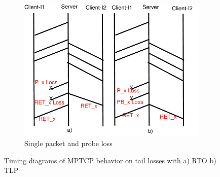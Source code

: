 \documentclass[10pt,conference,compsoc]{IEEEtran}
\begin{document}
\begin{figure}[!tbp]
\begin{subfigure}[b]{0.32\textwidth}
  	\includegraphics[angle=0, width=\textwidth, natwidth=610, natheight=400]{images/timing1PP.pdf}
	\caption{Single packet and probe loss}\label{timing1PP}
 \end{subfigure}
 \caption{Timing diagrams of MPTCP behavior on tail losses with a) RTO b) TLP }\label{mptiming}	
\end{figure}
\end{document}
